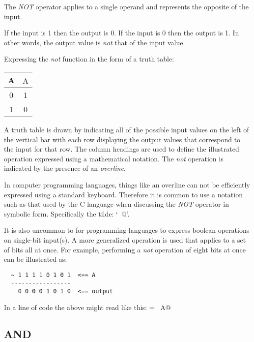 The {\em NOT} operator applies to a single operand and represents the 
opposite of the input.

If the input is 1 then the output is 0.  If the input is 0 then the
output is 1.  In other words, the output value is {\em not} that of the 
input value.

Expressing the {\em not} function in the form of a truth table:

\begin{center}
\begin{tabular}{c|c}
A & $\overline{\mbox{A}}$\\
\hline
0 & 1 \\
1 & 0 \\
\end{tabular}
\end{center}

A truth table is drawn by indicating all of the possible input values on 
the left of the vertical bar with each row displaying the output values 
that correspond to the input for that row.  The column headings are used
to define the illustrated operation expressed using a mathematical 
notation.  The {\em not} operation is indicated by the presence of
an {\em overline}.

In computer programming languages, things like an overline can not be 
efficiently expressed using a standard keyboard.  Therefore it is common 
to use a notation such as that used  by the C language when discussing 
the {\em NOT} operator in symbolic form.  Specifically the tilde: `\verb@~@'.

It is also uncommon to for programming languages to express boolean operations 
on single-bit input(s).  A more generalized operation is used that applies 
to a set of bits all at once.  For example, performing a {\em not} operation
of eight bits at once can be illustrated as:


\begin{verbatim}
  ~ 1 1 1 1 0 1 0 1  <== A
  -----------------
    0 0 0 0 1 0 1 0  <== output
\end{verbatim}

In a line of code the above might read like this: \verb@output = ~A@

\subsection{AND}

